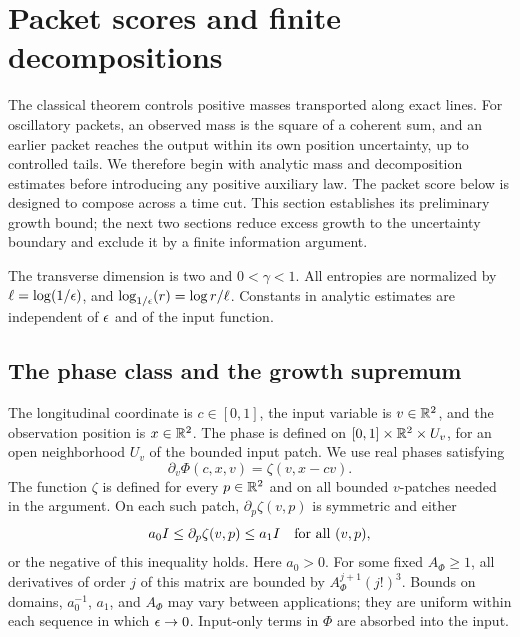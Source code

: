 \section{Packet scores and finite decompositions}
\label{sec:packet-structure}

The classical theorem controls positive masses transported along exact
lines. For oscillatory packets, an observed mass is the square of a
coherent sum, and an earlier packet reaches the output within its
own position uncertainty, up to controlled tails. We therefore begin with analytic mass and
decomposition estimates before introducing any positive auxiliary law.
The packet score below is designed to compose across a time cut.
This section establishes its preliminary growth bound; the next two
sections reduce excess growth to the uncertainty boundary and exclude
it by a finite information argument.

The transverse dimension is two and $0<\gamma<1$.
All entropies are normalized by $\ell=\log(1/\epsilon)$, and
$\log_{1/\epsilon}\!\left(r\right)=\log r/\ell$. Constants in analytic estimates are
independent of $\epsilon$ and of the input function.

\subsection{The phase class and the growth supremum}

The longitudinal coordinate is \(c\in[0,1]\), the input variable is
\(v\in\mathbb R^2\), and the observation position is \(x\in\mathbb R^2\).
The phase is defined on \([0,1]\times\mathbb R^2\times U_v\), for an open
neighborhood \(U_v\) of the bounded input patch.  We use real phases satisfying
\begin{equation}
 \partial_v\Phi(c,x,v)=\zeta(v,x-cv).
 \label{eq:packet-phase}
\end{equation}
The function \(\zeta\) is defined for every \(p\in\mathbb R^2\) and on all
bounded \(v\)-patches needed in the argument.  On each such patch,
\(\partial_p\zeta(v,p)\) is symmetric and either
\begin{equation}
 a_0 I\le \partial_p\zeta(v,p)\le a_1 I
 \quad\hbox{for all }(v,p),
 \label{eq:packet-definiteness}
\end{equation}
or the negative of this inequality holds.  Here \(a_0>0\).
For some fixed \(A_\Phi\ge1\), all derivatives of order \(j\) of this
matrix are bounded by \(A_\Phi^{j+1}(j!)^3\).  Bounds on domains,
\(a_0^{-1}\), \(a_1\), and \(A_\Phi\) may vary between applications;
they are uniform within each sequence in which \(\epsilon\to0\).
Input-only terms in \(\Phi\) are absorbed into the input.

